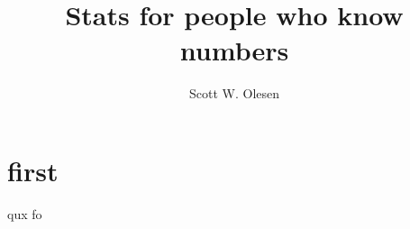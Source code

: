 \documentclass{book}
\title{Stats for people who know numbers}
\author{Scott W. Olesen}
\begin{document}
\maketitle

\frontmatter



\mainmatter

\chapter{first}

qux fo
\end{document}
